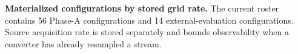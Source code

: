 \caption{\textbf{Materialized configurations by stored grid rate.} The current roster contains 56
Phase-A configurations and 14 external-evaluation configurations. Source acquisition rate is
stored separately and bounds observability when a converter has already resampled a stream.}
\label{fig:corpus}

